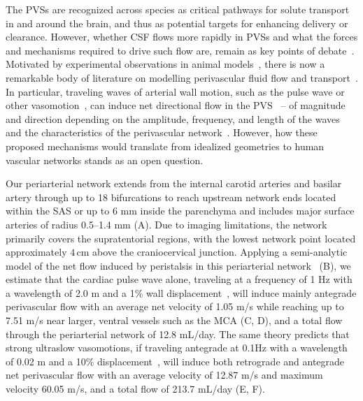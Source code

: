 \documentclass[fleqn,10pt]{wlscirep}
\begin{document}
The PVSs are recognized across species as critical pathways for solute
transport in and around the brain, and thus as potential targets for
enhancing delivery or clearance. However, whether CSF flows more
rapidly in PVSs and what the forces and mechanisms required to drive
such flow are, remain as key points of
debate~\cite{bohr2022glymphatic, van2024caa,
  kipnis2025resolving}. Motivated by experimental observations in
animal models~\cite{iliff2012paravascular, iliff2013cerebral,
  mestre2018flow, bedussi2018paravascular}, there is now a remarkable
body of literature on modelling perivascular fluid flow and
transport~\cite{bilston2003arterial, asgari2016glymphatic,
  rey2018pulsatile, daversin2020mechanisms, sharp2019dispersion,
  thomas2019fluid, kedarasetti2020functional, kedarasetti2020arterial,
  troyetsky2021dispersion, martinac2021phase, gjerde2023directional,
  nozaleda2024arterial}. In particular, traveling waves of arterial
wall motion, such as the pulse wave or other
vasomotion~\cite{vanveluw2020vasomotion, munting2023spontaneous,
  bojarskaite2023sleep, broggini2024long,hauglund2025norepinephrine},
can induce net directional flow in the
PVS~\cite{kedarasetti2020arterial, kedarasetti2020functional,
  coenen2021lubrication, gjerde2023directional, nozaleda2024arterial}
-- of magnitude and direction depending on the amplitude, frequency,
and length of the waves and the characteristics of the perivascular
network~\cite{gjerde2023directional}. However, how these proposed
mechanisms would translate from idealized geometries to human vascular
networks stands as an open question. 

Our periarterial network extends from the internal carotid arteries
and basilar artery through up to 18 bifurcations to reach upstream
network ends located within the SAS or up to 6 mm inside the
parenchyma and includes major surface arteries of radius 0.5--1.4 mm
(A). Due to imaging limitations, the network primarily
covers the supratentorial regions, with the lowest network point
located approximately $4\,$cm above the craniocervical
junction. Applying a semi-analytic model of the net flow induced by
peristalsis in this periarterial network~\cite{gjerde2023directional}
(B), we estimate that the cardiac pulse wave alone,
traveling at a frequency of 1 Hz with a wavelength of 2.0 m and a 1\%
wall displacement~\cite{jung2021novel}, will induce mainly antegrade
perivascular flow with an average net velocity of 1.05 \textmu m/s
while reaching up to 7.51 \textmu m/s near larger, ventral vessels
such as the MCA (C, D), and a total flow through the
periarterial network of 12.8 mL/day. The same theory
predicts that strong ultraslow vasomotions, if traveling antegrade at
0.1Hz with a wavelength of 0.02 m and a 10\%
displacement~\cite{broggini2024long}, will induce both retrograde and
antegrade net perivascular flow with an average velocity of 12.87
\textmu m/s and maximum velocity 60.05 \textmu m/s, and a total flow
of 213.7 mL/day (E, F). 
\end{document}
